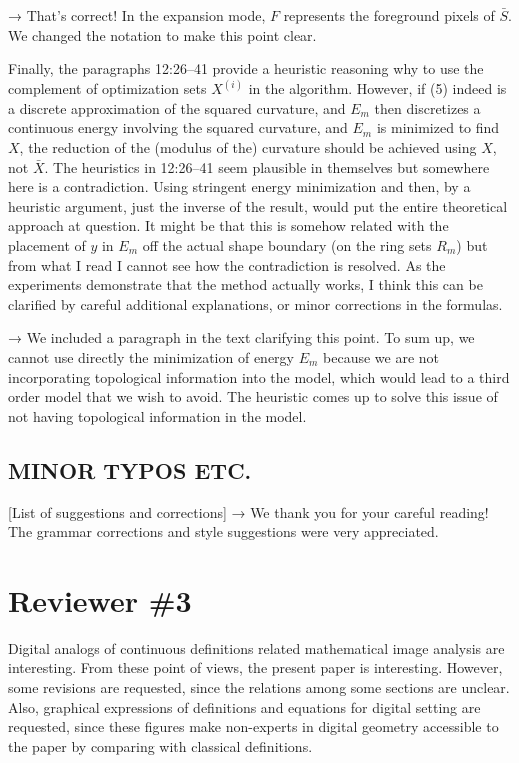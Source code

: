 \documentclass[12pt]{article}
\begin{document}
→ That's correct! In the expansion mode, $F$ represents the foreground pixels of $\bar{S}$. We changed the notation to make this point clear.



Finally, the paragraphs 12:26--41 provide a heuristic reasoning why to use the complement of optimization sets $X^{(i)}$ in the algorithm. However, if (5) indeed is a discrete approximation of the squared curvature, and $E_m$ then discretizes a continuous energy involving the squared curvature, and $E_m$ is minimized to find $X$, the reduction of the (modulus of the) curvature should be achieved using $X$, not $\bar{X}$. The heuristics in 12:26--41 seem plausible in themselves but somewhere here is a contradiction. Using stringent energy minimization and then, by a heuristic argument, just the inverse of the result, would put the entire theoretical approach at question. It might be that this is somehow related with the placement of $y$ in $E_m$ off the actual shape boundary (on the ring sets $R_m$) but from what I read I cannot see how the contradiction is resolved. As the experiments demonstrate that the method actually works, I think this can be clarified by careful additional explanations, or minor corrections in the formulas.

→ We included a paragraph in the text clarifying this point. To sum up, we cannot use directly the minimization of energy $E_m$ because we are not incorporating topological information into the model, which would lead to a third order model that we wish to avoid. The heuristic comes up to solve this issue of not having topological information in the model.

\subsection{MINOR TYPOS ETC.}

[List of suggestions and corrections]
→ We thank you for your careful reading! The grammar corrections and style suggestions were very appreciated.



\section{Reviewer \#3}

Digital analogs of continuous definitions related mathematical image analysis are interesting. From these point of views, the present paper is interesting. However, some revisions are requested, since the relations among some sections are unclear. Also, graphical expressions of definitions and equations for digital setting are requested, since these figures make non-experts in digital geometry accessible to the paper by comparing with classical definitions.
\end{document}

